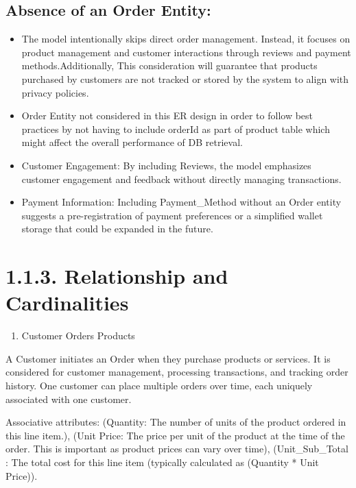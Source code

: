 \documentclass[
]{article}
\providecommand{\tightlist}{%
  \setlength{\itemsep}{0pt}\setlength{\parskip}{0pt}}
\begin{document}
\hypertarget{absence-of-an-order-entity}{%
\subsection{Absence of an Order
Entity:}\label{absence-of-an-order-entity}}

\begin{itemize}
\item
  The model intentionally skips direct order management. Instead, it
  focuses on product management and customer interactions through
  reviews and payment methods.Additionally, This consideration will
  guarantee that products purchased by customers are not tracked or
  stored by the system to align with privacy policies.
\item
  Order Entity not considered in this ER design in order to follow best
  practices by not having to include orderId as part of product table
  which might affect the overall performance of DB retrieval.
\item
  Customer Engagement: By including Reviews, the model emphasizes
  customer engagement and feedback without directly managing
  transactions.
\item
  Payment Information: Including Payment\_Method without an Order entity
  suggests a pre-registration of payment preferences or a simplified
  wallet storage that could be expanded in the future.
\end{itemize}

\hypertarget{relationship-and-cardinalities}{%
\section{1.1.3. Relationship and
Cardinalities}\label{relationship-and-cardinalities}}

\begin{enumerate}
\def\labelenumi{\arabic{enumi}.}
\tightlist
\item
  Customer Orders Products
\end{enumerate}

A Customer initiates an Order when they purchase products or services.
It is considered for customer management, processing transactions, and
tracking order history. One customer can place multiple orders over
time, each uniquely associated with one customer.

Associative attributes: (Quantity: The number of units of the product
ordered in this line item.), (Unit Price: The price per unit of the
product at the time of the order. This is important as product prices
can vary over time), (Unit\_Sub\_Total : The total cost for this line
item (typically calculated as (Quantity * Unit Price)).
\end{document}
